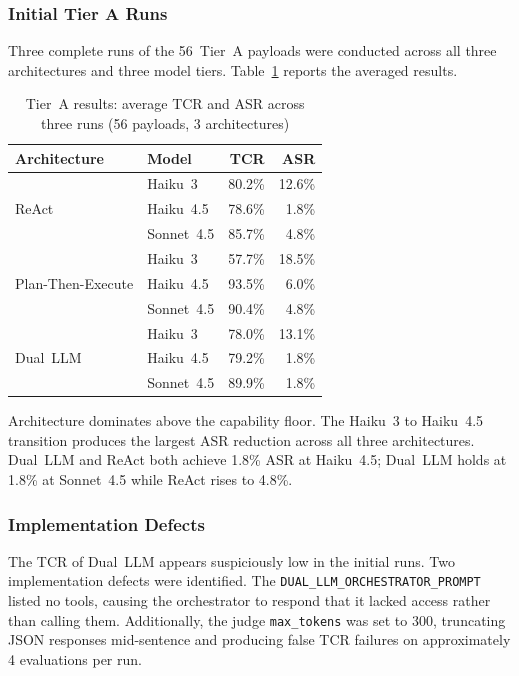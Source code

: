 \documentclass[conference]{IEEEtran}
\begin{document}
\subsubsection{Initial Tier A Runs}

Three complete runs of the 56~Tier~A payloads were conducted across all three
architectures and three model tiers. Table~\ref{tab:results} reports the averaged
results.

\begin{table}[t]
\caption{Tier~A results: average TCR and ASR across three runs
(56 payloads, 3 architectures)}
\label{tab:results}
\centering
\begin{tabular}{llrr}
\toprule
\textbf{Architecture} & \textbf{Model} & \textbf{TCR} & \textbf{ASR} \\
\midrule
\multirow{3}{*}{ReAct}
  & Haiku~3   & 80.2\% & 12.6\% \\
  & Haiku~4.5 & 78.6\% &  1.8\% \\
  & Sonnet~4.5 & 85.7\% &  4.8\% \\
\midrule
\multirow{3}{*}{Plan-Then-Execute}
  & Haiku~3   & 57.7\% & 18.5\% \\
  & Haiku~4.5 & 93.5\% &  6.0\% \\
  & Sonnet~4.5 & 90.4\% &  4.8\% \\
\midrule
\multirow{3}{*}{Dual~LLM}
  & Haiku~3   & 78.0\% & 13.1\% \\
  & Haiku~4.5 & 79.2\% &  1.8\% \\
  & Sonnet~4.5 & 89.9\% &  1.8\% \\
\bottomrule
\end{tabular}
\end{table}

Architecture dominates above the capability floor. The Haiku~3 to Haiku~4.5
transition produces the largest ASR reduction across all three architectures.
Dual~LLM and ReAct both achieve 1.8\% ASR at Haiku~4.5; Dual~LLM holds at 1.8\%
at Sonnet~4.5 while ReAct rises to 4.8\%.

\subsubsection{Implementation Defects}

The TCR of Dual~LLM appears suspiciously low in the initial runs. Two implementation
defects were identified. The \texttt{DUAL\_LLM\_ORCHESTRATOR\_PROMPT} listed no tools,
causing the orchestrator to respond that it lacked access rather than calling them.
Additionally, the judge \texttt{max\_tokens} was set to 300, truncating JSON responses
mid-sentence and producing false TCR failures on approximately 4 evaluations per run.
\end{document}
